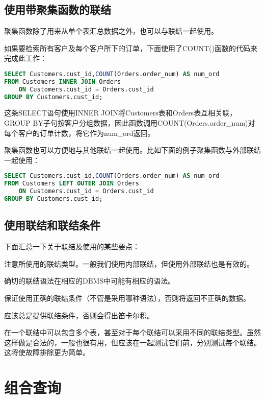 \subsection{使用带聚集函数的联结}

聚集函数除了用来从单个表汇总数据之外，也可以与联结一起使用。

如果要检索所有客户及每个客户所下的订单，下面使用了COUNT()函数的代码来完成此工作：

\begin{lstlisting}[language=SQL]
SELECT Customers.cust_id,COUNT(Orders.order_num) AS num_ord
FROM Customers INNER JOIN Orders
	ON Customers.cust_id = Orders.cust_id
GROUP BY Customers.cust_id;
\end{lstlisting}

这条SELECT语句使用INNER JOIN将Customers表和Orders表互相关联，GROUP BY子句按客户分组数据，因此函数调用COUNT(Orders.order\_num)对每个客户的订单计数，将它作为num\_ord返回。

聚集函数也可以方便地与其他联结一起使用。比如下面的例子聚集函数与外部联结一起使用：

\begin{lstlisting}[language=SQL]
SELECT Customers.cust_id,COUNT(Orders.order_num) AS num_ord
FROM Customers LEFT OUTER JOIN Orders
	ON Customers.cust_id = Orders.cust_id
GROUP BY Customers.cust_id;
\end{lstlisting}
\subsection{使用联结和联结条件}

下面汇总一下关于联结及使用的某些要点：

\begin{compactitem}
\item 注意所使用的联结类型。一般我们使用内部联结，但使用外部联结也是有效的。
\item 确切的联结语法在相应的DBMS中可能有相应的语法。
\item 保证使用正确的联结条件（不管是采用哪种语法），否则将返回不正确的数据。
\item 应该总是提供联结条件，否则会得出笛卡尔积。
\item 在一个联结中可以包含多个表，甚至对于每个联结可以采用不同的联结类型。虽然这样做是合法的，一般也很有用，但应该在一起测试它们前，分别测试每个联结。这将使故障排除更为简单。
\end{compactitem}


\section{组合查询}


